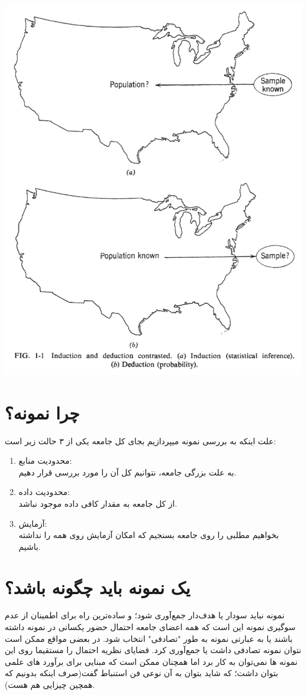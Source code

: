 \documentclass[12pt,onecolumn,a4paper]{article}
\begin{document}
\includegraphics[width=\textwidth]{fig1.png}

\section{چرا نمونه؟}
علت اینکه به بررسی نمونه میپردازیم بجای کل جامعه یکی از ۳ حالت زیر است:
\begin{enumerate}
    \item محدودیت منابع:\\
    به علت بزرگی جامعه، نتوانیم کل آن را مورد بررسی قرار دهیم.
    \item محدودیت داده:\\
    از کل جامعه به مقدار کافی داده موجود نباشد.
    \item آزمایش:\\
    بخواهیم مطلبی را روی جامعه بسنجیم که امکان آزمایش روی همه را نداشته باشیم.
\end{enumerate}

\section{یک نمونه باید چگونه باشد؟}
نمونه نباید سودار یا هدف‌دار جمع‌آوری شود؛ و ساده‌ترین راه برای اطمینان از عدم سوگیری نمونه این است که همه اعضای جامعه احتمال حضور یکسانی در نمونه داشته باشند یا به عبارتی نمونه به طور "تصادفی" انتخاب شود.
در بعضی مواقع ممکن است نتوان نمونه تصادفی داشت یا جمع‌آوری کرد. قضایای نظریه احتمال را مستقیما روی این نمونه ها نمی‌توان به کار برد اما همچنان ممکن است که مبنایی برای  برآورد های علمی بتوان داشت؛ که شاید بتوان به آن نوعی فن استنباط گفت(صرف اینکه بدونیم که همچین چیزایی هم هست).
\end{document}
